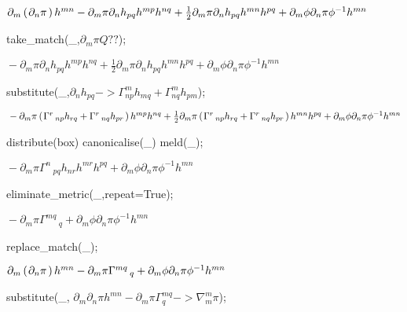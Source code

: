 \documentclass[10pt]{article}
\newcommand\brwrap[3]{%
  \setbox0=\hbox{$#2$}
  \left#1\vbox to \the\ht0{\hbox to 0pt{}}\right.\kern-.2em
  \begingroup #2\endgroup\kern-.15em
  \left.\vbox to \the\ht0{\hbox to 0pt{}}\right#3
}
\begin{document}
\begin{adjustwidth}{1em}{0cm}${}\partial_{m}\brwrap{(}{\partial_{n}{\pi}}{)} h^{m n}-\partial_{m}{\pi} \partial_{n}{h_{p q}} h^{m p} h^{n q}+\frac{1}{2}\partial_{m}{\pi} \partial_{n}{h_{p q}} h^{m n} h^{p q}+\partial_{m}{\phi} \partial_{n}{\pi} {\phi}^{-1} h^{m n}$\end{adjustwidth}
\begin{python}
take_match(_,$\partial_{m}{\pi} Q??$);
\end{python}
\begin{adjustwidth}{1em}{0cm}${}-\partial_{m}{\pi} \partial_{n}{h_{p q}} h^{m p} h^{n q}+\frac{1}{2}\partial_{m}{\pi} \partial_{n}{h_{p q}} h^{m n} h^{p q}+\partial_{m}{\phi} \partial_{n}{\pi} {\phi}^{-1} h^{m n}$\end{adjustwidth}
\begin{python}
substitute(_,$\partial_{n}{h_{p q}}-> \Gamma^{m}_{n p} h_{m q} + \Gamma^{m}_{n q} h_{p m}$);
\end{python}
\begin{adjustwidth}{1em}{0cm}${}-\partial_{m}{\pi} \brwrap{(}{\Gamma^{r}\,_{n p} h_{r q}+\Gamma^{r}\,_{n q} h_{p r}}{)} h^{m p} h^{n q}+\frac{1}{2}\partial_{m}{\pi} \brwrap{(}{\Gamma^{r}\,_{n p} h_{r q}+\Gamma^{r}\,_{n q} h_{p r}}{)} h^{m n} h^{p q}+\partial_{m}{\phi} \partial_{n}{\pi} {\phi}^{-1} h^{m n}$\end{adjustwidth}
\begin{python}
distribute(box)
canonicalise(_)
meld(_);
\end{python}
\begin{adjustwidth}{1em}{0cm}${}-\partial_{m}{\pi} \Gamma^{n}\,_{p q} h_{n r} h^{m r} h^{p q}+\partial_{m}{\phi} \partial_{n}{\pi} {\phi}^{-1} h^{m n}$\end{adjustwidth}
\begin{python}
eliminate_metric(_,repeat=True);
\end{python}
\begin{adjustwidth}{1em}{0cm}${}-\partial_{m}{\pi} \Gamma^{m q}\,_{q}+\partial_{m}{\phi} \partial_{n}{\pi} {\phi}^{-1} h^{m n}$\end{adjustwidth}
\begin{python}
replace_match(_);
\end{python}
\begin{adjustwidth}{1em}{0cm}${}\partial_{m}\brwrap{(}{\partial_{n}{\pi}}{)} h^{m n}-\partial_{m}{\pi} \Gamma^{m q}\,_{q}+\partial_{m}{\phi} \partial_{n}{\pi} {\phi}^{-1} h^{m n}$\end{adjustwidth}
\begin{python}
substitute(_, $\partial_{m}{\partial_{n}{\pi}} h^{m n} - \partial_{m}{\pi} \Gamma^{m q}_{q} -> \nabla^{m}_{m}{\pi}$);
\end{python}
\end{document}
